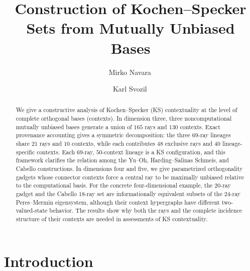 \documentclass[%
  reprint,
  superscriptaddress,
  showpacs,
  showkeys,
  amsmath,amssymb,
  pra,
  longbibliography,
  floatfix,
  x11names
]{revtex4-2}
\newcommand{\rev}[1]{{#1}}
\begin{document}
\title{Construction of Kochen--Specker Sets from Mutually Unbiased Bases}

\author{Mirko Navara\,}


\author{Karl Svozil\,}


\begin{abstract}
\rev{We give a constructive analysis of Kochen--Specker (KS) contextuality at the level of complete orthogonal bases (contexts). In dimension three, three noncomputational mutually unbiased bases generate a union of $165$ rays and $130$ contexts. Exact provenance accounting gives a symmetric decomposition: the three $69$-ray lineages share $21$ rays and $10$ contexts, while each contributes $48$ exclusive rays and $40$ lineage-specific contexts. Each $69$-ray, $50$-context lineage is a KS configuration, and this framework clarifies the relation among the Yu--Oh, Harding--Salinas Schmeis, and Cabello constructions. In dimensions four and five, we give parametrized orthogonality gadgets whose connector contexts force a central ray to be maximally unbiased relative to the computational basis. For the concrete four-dimensional example, the $20$-ray gadget and the Cabello $18$-ray set are informationally equivalent subsets of the $24$-ray Peres--Mermin eigensystem, although their context hypergraphs have different two-valued-state behavior. The results show why both the rays and the complete incidence structure of their contexts are needed in assessments of KS contextuality.}
\end{abstract}


\maketitle



\section{Introduction}
\end{document}
